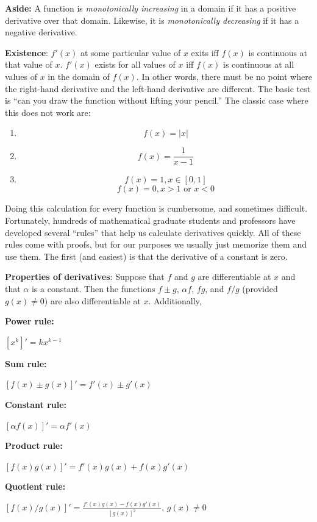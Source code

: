 \documentclass[11pt]{article}
\newcommand{\be}{\begin{enumerate}}
\newcommand{\ee}{\end{enumerate}}
\newcommand{\pbt}{\parbox[t]{2in}}
\begin{document}
\item \textbf{Aside:} A function is \textit{monotonically increasing}
  in a domain if it has a positive derivative over that domain.
  Likewise, it is \textit{monotonically decreasing} if it has a negative
  derivative.

\item \textbf{Existence}: $f'(x)$ at some particular value of $x$
  exits iff $f(x)$ is continuous at that value of $x$.  $f'(x)$ exists
  for all values of $x$ iff $f(x)$ is continuous at all values of $x$
  in the domain of $f(x)$.  In other words, there must be no point
  where the right-hand derivative and the left-hand derivative are
  different.  The basic test is ``can you draw the function without
  lifting your pencil.''  The classic case where this does not work
  are:

\be
\item $$f(x) = |x|$$
\item $$ f(x) = \frac{1}{x-1}$$
\item $$f(x) = 1, x \in [0,1]$$
$$ f(x) = 0,  x > 1 \mbox{ or } x<0$$
\ee 


\item Doing this calculation for every function is cumbersome, and
  sometimes difficult.  Fortunately, hundreds of mathematical graduate
  students and professors have developed several ``rules'' that help
  us calculate derivatives quickly.  All of these rules come with
  proofs, but for our purposes we usually just memorize them and use
  them.  The first (and easiest) is that the derivative of a constant
  is zero.


\textbf{Properties of derivatives}:  Suppose that $f$ and $g$ are
differentiable at $x$ and that $\alpha$ is a constant.  Then the
functions $f\pm g$, $\alpha f$, $f g$, and $f/g$ (provided $g(x)\ne 0$)
are also differentiable at $x$.  Additionally,\\
  \pbt{\bf Power rule:} $[x^k]' = k x^{k-1}$  \\
  \pbt{\bf Sum rule:} $[f(x)\pm g(x)]' = f'(x)\pm g'(x)$ \\
  \pbt{\bf Constant rule:} $[\alpha f(x)]' = \alpha f'(x)$ \\
  \pbt{\bf Product rule:} $[f(x)g(x)]' = f'(x)g(x)+f(x)g'(x)$\\
  \pbt{\bf Quotient rule:} $[f(x)/g(x)]' =
\frac{f'(x)g(x)-f(x)g'(x)}{[g(x)]^2}$, $g(x)\ne 0$\\
\end{document}
